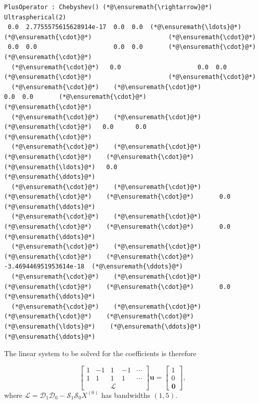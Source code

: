 \documentclass[12pt,a4paper]{article}
\begin{document}
\begin{lstlisting}
PlusOperator : Chebyshev() (*@\ensuremath{\rightarrow}@*) Ultraspherical(2)
 0.0  2.7755575615628914e-17  0.0  0.0  (*@\ensuremath{\ldots}@*)    (*@\ensuremath{\cdot}@*)                     (*@\ensuremath{\cdot}@*)
 0.0  0.0                     0.0  0.0       (*@\ensuremath{\cdot}@*)                     (*@\ensuremath{\cdot}@*)
  (*@\ensuremath{\cdot}@*)   0.0                     0.0  0.0       (*@\ensuremath{\cdot}@*)                     (*@\ensuremath{\cdot}@*)
  (*@\ensuremath{\cdot}@*)    (*@\ensuremath{\cdot}@*)                      0.0  0.0       (*@\ensuremath{\cdot}@*)                     (*@\ensuremath{\cdot}@*)
  (*@\ensuremath{\cdot}@*)    (*@\ensuremath{\cdot}@*)                       (*@\ensuremath{\cdot}@*)   0.0      0.0                    (*@\ensuremath{\cdot}@*)
  (*@\ensuremath{\cdot}@*)    (*@\ensuremath{\cdot}@*)                       (*@\ensuremath{\cdot}@*)    (*@\ensuremath{\cdot}@*)   (*@\ensuremath{\ldots}@*)   0.0                    (*@\ensuremath{\ddots}@*)
  (*@\ensuremath{\cdot}@*)    (*@\ensuremath{\cdot}@*)                       (*@\ensuremath{\cdot}@*)    (*@\ensuremath{\cdot}@*)       0.0                    (*@\ensuremath{\ddots}@*)
  (*@\ensuremath{\cdot}@*)    (*@\ensuremath{\cdot}@*)                       (*@\ensuremath{\cdot}@*)    (*@\ensuremath{\cdot}@*)       0.0                    (*@\ensuremath{\ddots}@*)
  (*@\ensuremath{\cdot}@*)    (*@\ensuremath{\cdot}@*)                       (*@\ensuremath{\cdot}@*)    (*@\ensuremath{\cdot}@*)      -3.469446951953614e-18  (*@\ensuremath{\ddots}@*)
  (*@\ensuremath{\cdot}@*)    (*@\ensuremath{\cdot}@*)                       (*@\ensuremath{\cdot}@*)    (*@\ensuremath{\cdot}@*)       0.0                    (*@\ensuremath{\ddots}@*)
  (*@\ensuremath{\cdot}@*)    (*@\ensuremath{\cdot}@*)                       (*@\ensuremath{\cdot}@*)    (*@\ensuremath{\cdot}@*)   (*@\ensuremath{\ldots}@*)    (*@\ensuremath{\ddots}@*)                     (*@\ensuremath{\ddots}@*)
\end{lstlisting}


The linear system to be solved for the coefficients is therefore

\[
\begin{bmatrix}
1 & -1 &  1 & -1 & \cdots  \\
1 & 1  &  1 & 1  & \cdots \\
& &\mathcal{L} & &
\end{bmatrix}\mathbf{u} = \begin{bmatrix} 1  \\
0 \\
\mathbf{0}
\end{bmatrix},
\]
where $\mathcal{L} = \mathcal{D}_1\mathcal{D}_0  - \mathcal{S}_1\mathcal{S}_0X^{(0)} $ has bandwidths $(1,5)$.
\end{document}
